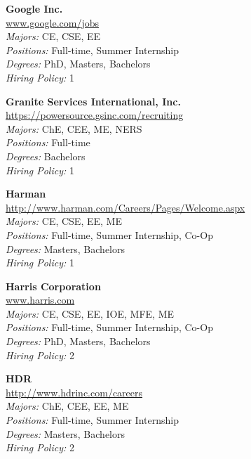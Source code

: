 \documentclass[twoside]{article}
\begin{document}
\begin{center}
\begin{multicols}{3}
\begin{minipage}{.9\columnwidth}{\Large\bf Google Inc. }\\
	\url{www.google.com/jobs}\\
	\emph{Majors:} CE, CSE, EE\\
	\emph{Positions:} Full-time, Summer Internship\\
	\emph{Degrees:} PhD, Masters, Bachelors\\
	\emph{Hiring Policy:} 1\\
\end{minipage}
 
\begin{minipage}{.9\columnwidth}{\Large\bf Granite Services International, Inc. }\\
	\url{https://powersource.gsinc.com/recruiting}\\
	\emph{Majors:} ChE, CEE, ME, NERS\\
	\emph{Positions:} Full-time\\
	\emph{Degrees:} Bachelors\\
	\emph{Hiring Policy:} 1\\
\end{minipage}
 
\begin{minipage}{.9\columnwidth}{\Large\bf Harman }\\
	\url{http://www.harman.com/Careers/Pages/Welcome.aspx}\\
	\emph{Majors:} CE, CSE, EE, ME\\
	\emph{Positions:} Full-time, Summer Internship, Co-Op\\
	\emph{Degrees:} Masters, Bachelors\\
	\emph{Hiring Policy:} 1\\
\end{minipage}
 
\begin{minipage}{.9\columnwidth}{\Large\bf Harris Corporation }\\
	\url{www.harris.com}\\
	\emph{Majors:} CE, CSE, EE, IOE, MFE, ME\\
	\emph{Positions:} Full-time, Summer Internship, Co-Op\\
	\emph{Degrees:} PhD, Masters, Bachelors\\
	\emph{Hiring Policy:} 2\\
\end{minipage}
 
\begin{minipage}{.9\columnwidth}{\Large\bf HDR }\\
	\url{http://www.hdrinc.com/careers}\\
	\emph{Majors:} ChE, CEE, EE, ME\\
	\emph{Positions:} Full-time, Summer Internship\\
	\emph{Degrees:} Masters, Bachelors\\
	\emph{Hiring Policy:} 2\\
\end{minipage}
 

\end{multicols}
\end{center}
\end{document}
